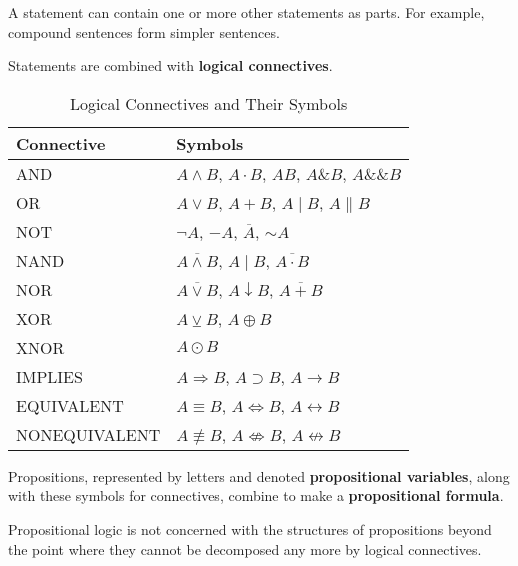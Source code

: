 \documentclass{article}
\begin{document}
    A statement can contain one or more other statements as parts. For example, compound sentences form simpler sentences. 

    \begin{definition}[Connectives]
      Statements are combined with \textbf{logical connectives}. 
      \begin{table}[H]
        \centering
        \begin{tabular}{|l|l|}
        \hline
        \textbf{Connective} & \textbf{Symbols} \\
        \hline
        AND & $A \wedge B$, $A \cdot B$, $AB$, $A \& B$, $A \&\& B$ \\
        \hline
        OR & $A \vee B$, $A + B$, $A \mid B$, $A \parallel B$ \\
        \hline
        NOT & $\neg A$, $-A$, $\overline{A}$, $\sim A$ \\
        \hline
        NAND & $\overline{A \wedge B}$, $A \mid B$, $\overline{A \cdot B}$ \\
        \hline
        NOR & $\overline{A \vee B}$, $A \downarrow B$, $\overline{A + B}$ \\
        \hline
        XOR & $A \veebar B$, $A \oplus B$ \\
        \hline
        XNOR & $A \odot B$ \\
        \hline
        IMPLIES & $A \Rightarrow B$, $A \supset B$, $A \rightarrow B$ \\
        \hline
        EQUIVALENT & $A \equiv B$, $A \Leftrightarrow B$, $A \leftrightarrow B$ \\
        \hline
        NONEQUIVALENT & $A \not\equiv B$, $A \not\Leftrightarrow B$, $A \not\leftrightarrow B$ \\
        \hline
        \end{tabular}
        \caption{Logical Connectives and Their Symbols}
        \label{tab:logical-connectives}
      \end{table} 
    \end{definition} 

    \begin{definition}
      Propositions, represented by letters and denoted \textbf{propositional variables}, along with these symbols for connectives, combine to make a \textbf{propositional formula}. 
    \end{definition}

    Propositional logic is not concerned with the structures of propositions beyond the point where they cannot be decomposed any more by logical connectives. 
\end{document}
